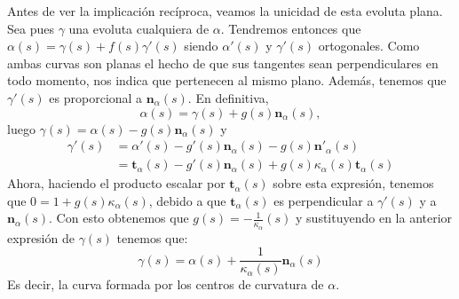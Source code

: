 Antes de ver la implicación recíproca, veamos la unicidad de esta evoluta plana.
Sea pues $\gamma$ una evoluta cualquiera de $\alpha$. Tendremos entonces que
$\alpha\left( s \right) = \gamma\left( s \right) + f\left( s
\right)\gamma'\left( s \right)$ siendo $\alpha'\left( s \right)$ y
$\gamma'\left( s \right)$ ortogonales. Como ambas curvas son planas el hecho de
que sus tangentes sean perpendiculares en todo momento, nos indica que
pertenecen al mismo plano. Además, tenemos que $\gamma'\left( s \right)$ es
proporcional a $\mathbf{n}_{\alpha}\left( s \right)$. En definitiva,
\[
\alpha\left( s \right) = \gamma\left( s \right) + g\left( s
\right)\mathbf{n}_{\alpha} \left( s \right),
\]
luego $\gamma\left( s \right) = \alpha\left( s \right) - g\left( s
\right)\mathbf{n}_{\alpha}\left( s \right)$ y
\begin{align*}
    \gamma'\left( s \right) &= \alpha'\left( s \right) - g'\left( s \right)
    \mathbf{n}_{\alpha}\left( s \right) - g\left( s
    \right)\mathbf{n}'_{\alpha}\left( s \right)\\
    &= \mathbf{t}_{\alpha}\left( s \right) - g'\left( s
    \right)\mathbf{n}_{\alpha}\left( s \right) + g\left( s \right)
    \kappa_{\alpha}\left( s \right) \mathbf{t}_{\alpha}\left( s \right)
\end{align*}
Ahora, haciendo el producto escalar por $\mathbf{t}_{\alpha}\left( s \right)$
sobre esta expresión, tenemos que $0 = 1 + g\left( s
\right)\kappa_{\alpha}\left( s \right)$, debido a que $\mathbf{t}_{\alpha}\left(
s\right)$ es perpendicular a $\gamma'\left( s \right)$ y a
$\mathbf{n}_{\alpha}\left( s \right)$. Con esto obtenemos que $g\left( s \right)
= -\frac{1}{\kappa_{\alpha}}\left( s \right)$ y sustituyendo en la anterior
expresión de $\gamma\left( s \right)$ tenemos que:
\[
\gamma\left( s \right) = \alpha\left( s \right) + \frac{1}{\kappa_{\alpha}\left(
s \right)} \mathbf{n}_{\alpha}\left( s \right)
\]
Es decir, la curva formada por los centros de curvatura de $\alpha$.

